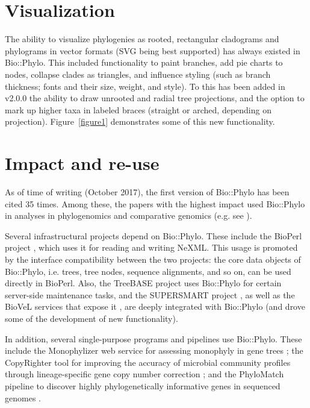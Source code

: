 \documentclass{bioinfo}
\begin{document}
\section{Visualization}

The ability to visualize phylogenies as rooted, rectangular cladograms and phylograms in
vector formats (SVG being best supported) has always existed in Bio::Phylo. This included
functionality to paint branches, add pie charts to nodes, collapse clades as triangles,
and influence styling (such as branch thickness; fonts and their size, weight, and style).
To this has been added in v2.0.0 the ability to draw unrooted and radial tree projections,
and the option to mark up higher taxa in labeled braces (straight or arched, depending on 
projection). Figure~\ref{figure1} demonstrates some of this new functionality.

\section{Impact and re-use}

As of time of writing (October 2017), the first version of Bio::Phylo has been cited 35
times. Among these, the papers with the highest impact used Bio::Phylo in analyses in
phylogenomics and comparative genomics (e.g. see \citet{Roure2012,Hayward2013,Smet2013}).

Several infrastructural projects depend on Bio::Phylo. These include the BioPerl project 
\citep{Stajich2002}, which uses it for reading and writing NeXML. This usage is promoted
by the interface compatibility between the two projects: the core data objects of 
Bio::Phylo, i.e. trees, tree nodes, sequence alignments, and so on, can be used directly
in BioPerl. Also, the TreeBASE project \citep{Piel2009} uses Bio::Phylo for certain
server-side maintenance tasks, and the SUPERSMART project \citep{Antonelli2017}, as well
as the BioVeL services that expose it \citep{Hardisty2016}, are deeply integrated with 
Bio::Phylo (and drove some of the development of new functionality). 

In addition, several single-purpose programs and pipelines use Bio::Phylo. These include
the Monophylizer web service for assessing monophyly in gene trees 
\citep{Mutanen2016,Mutanen2016a}; the CopyRighter tool for improving the accuracy of 
microbial community profiles through lineage-specific gene copy number correction
\citep{Angly2014}; and the PhyloMatch pipeline to discover highly phylogenetically 
informative genes in sequenced genomes \citep{Ramazzotti2012}.
\end{document}
